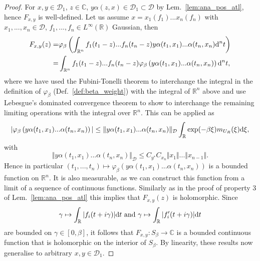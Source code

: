 \documentclass[sn-mathphys-num]{sn-jnl}%
\newcommand{\CC}{\mathbb{C}}
\newcommand{\RR}{\mathbb{R}}
\newcommand{\diff}{\textup{d}}
\numberwithin{equation}{section}
\theoremstyle{thmstyleone}%
\theoremstyle{thmstyletwo}%
\theoremstyle{thmstylethree}%
\begin{document}
\begin{proof}
For $x,y\in\mathcal{D}_1$, $z\in \CC$, $y\alpha(z,x)\in\mathcal{D}_1\subset\mathcal{D}$ by Lem.\ \ref{lem:ana_pos_atl}, hence $F_{x,y}$ is well-defined. Let us assume $x=x_1(f_1)...x_n(f_n)$ with $x_1,...,x_n\in\mathcal{D}$, $f_1,...,f_n\in L^\infty(\RR)$ Gaussian, then 
\begin{align}
    F_{x,y}(z)=&\varphi_\beta\left(\int_{\RR^n} f_1(t_1-z)...f_n(t_n-z)y\alpha(t_1,x_1)...\alpha(t_n,x_n)\diff^n t\right)\nonumber\\
    =&\int_{\RR^n} f_1(t_1-z)...f_n(t_n-z)\varphi_\beta\left(y\alpha(t_1,x_1)...\alpha(t_n,x_n)\right)\diff^n t,
\end{align}
where we have used the Fubini-Tonelli theorem to interchange the integral in the definition of $\varphi_\beta$ (Def.~\ref{def:beta_weight}) with the integral of $\RR^n$ above and use Lebesgue's dominated convergence theorem to show to interchange the remaining limiting operations with the integral over $\RR^n$. This can be applied as 
\begin{equation}
    \vert\varphi_\beta\left(y\alpha(t_1,x_1)...\alpha(t_n,x_n)\right)\vert\leq\Vert y\alpha(t_1,x_1)...\alpha(t_n,x_n)\Vert_\mathcal{D}\int_{\RR}\exp(-\beta\xi)m_{U_R}(\xi)\diff\xi,
\end{equation}
with 
\begin{equation}
    \Vert y\alpha(t_1,x_1)...\alpha(t_n,x_n)\Vert_\mathcal{D}\leq C_{y^*}C_{x_n}\Vert x_1\Vert...\Vert x_{n-1}\Vert.
\end{equation}
Hence in particular $(t_1,...,t_n)\mapsto\varphi_\beta\left(y\alpha(t_1,x_1)...\alpha(t_n,x_n)\right)$ is a bounded function on $\RR^n$. It is also measurable, as we can construct this function from a limit of a sequence of continuous functions. Similarly as in the proof of property 3 of Lem.\ \ref{lem:ana_pos_atl} this implies that $F_{x,y}(z)$ is holomorphic. Since 
\begin{equation}
    \gamma\mapsto \int_\RR \vert f_i(t+i\gamma)\vert\diff t\text{ and }\gamma\mapsto \int_\RR \vert f_i'(t+i\gamma)\vert\diff t
\end{equation} are bounded on $\gamma\in[0,\beta]$, it follows that $F_{x,y}:S_\beta\to\CC$ is a bounded continuous function that is holomorphic on the interior of $S_\beta$. By linearity, these results now generalise to arbitrary $x,y\in\mathcal{D}_1$.


\end{proof}
\end{document}
